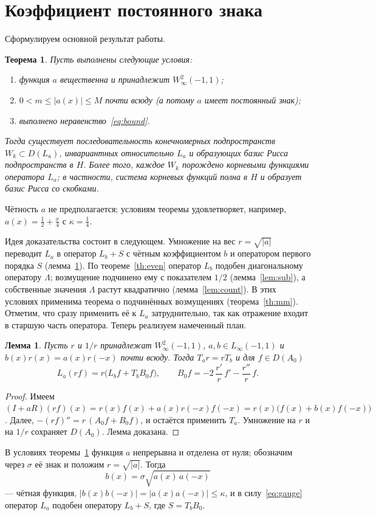 \documentclass[12pt,a4paper]{article}
\newtheorem{theorem}{Теорема}
\newtheorem{lemma}{Лемма}
\theoremstyle{definition}
\newcommand{\abs}[1]{\lvert#1\rvert}
\begin{document}
\section{Коэффициент постоянного знака}
Сформулируем основной результат работы.
\begin{theorem}\label{th:sign}
Пусть выполнены следующие условия:
\begin{enumerate}
\item[(i)] функция $a$ вещественна и принадлежит $W^2_\infty(-1,1)$;
\item[(ii)] $0<m\le\abs{a(x)}\le M$ почти всюду (а потому $a$ имеет постоянный знак);
\item[(iii)] выполнено неравенство~\eqref{eq:bound}.
\end{enumerate}
Тогда существует последовательность конечномерных подпространств $W_k\subset D(L_a)$,
инвариантных относительно $L_a$ и образующих базис Рисса подпространств в $H$. Более
того, каждое $W_k$ порождено корневыми функциями оператора $L_a$; в частности, система
корневых функций полна в $H$ и образует базис Рисса со скобками.
\end{theorem}
Чётность $a$ не предполагается; условиям теоремы удовлетворяет, например,
$a(x)=\tfrac12+\tfrac x4$ с $\kappa=\tfrac14$.

Идея доказательства состоит в следующем. Умножение на вес $r=\sqrt{\abs a}$ переводит
$L_a$ в оператор $L_b+S$ с чётным коэффициентом $b$ и оператором первого порядка $S$
(лемма~\ref{lem:gauge}). По теореме~\ref{th:even} оператор $L_b$ подобен диагональному
оператору $\Lambda$; возмущение подчинено ему с показателем $1/2$
(лемма~\ref{lem:sub}), а собственные значения $\Lambda$ растут квадратично
(лемма~\ref{lem:count}). В этих условиях применима теорема о подчинённых возмущениях
(теорема~\ref{th:mm}). Отметим, что сразу применить её к $L_a$ затруднительно, так как
отражение входит в старшую часть оператора. Теперь реализуем намеченный план.

\begin{lemma}\label{lem:gauge}
Пусть $r$ и $1/r$ принадлежат $W^2_\infty(-1,1)$, $a,b\in L_\infty(-1,1)$ и
$b(x)r(x)=a(x)r(-x)$ почти всюду. Тогда $T_ar=rT_b$ и для $f\in D(A_0)$
\begin{equation}\label{eq:gauge}
 L_a(rf)=r\bigl(L_bf+T_bB_0f\bigr),\qquad
 B_0f=-2\,\frac{r'}{r}\,f'-\frac{r''}{r}\,f .
\end{equation}
\end{lemma}
\begin{proof}
Имеем $(I+aR)(rf)(x)=r(x)f(x)+a(x)r(-x)f(-x)=r(x)\bigl(f(x)+b(x)f(-x)\bigr)$. Далее,
$-(rf)''=r\,(A_0f+B_0f)$, и остаётся применить $T_a$. Умножение на $r$ и на $1/r$
сохраняет $D(A_0)$. Лемма доказана.
\end{proof}
В условиях теоремы~\ref{th:sign} функция $a$ непрерывна и отделена от нуля; обозначим
через $\sigma$ её знак и положим $r=\sqrt{\abs a}$. Тогда
\[
 b(x)=\sigma\sqrt{a(x)\,a(-x)}
\]
--- чётная функция, $\abs{b(x)b(-x)}=\abs{a(x)a(-x)}\le\kappa$, и в силу~\eqref{eq:gauge}
оператор $L_a$ подобен оператору $L_b+S$, где $S=T_bB_0$.
\end{document}

